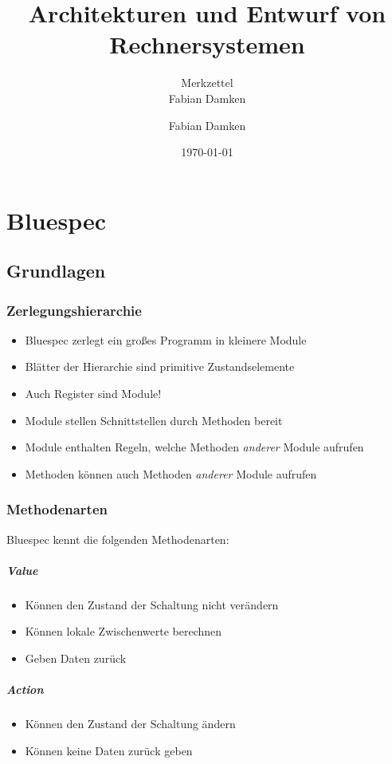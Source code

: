 \documentclass[a4paper, 11pt, accentcolor = tud3b]{tudreport}
\title{Architekturen und Entwurf von Rechnersystemen}
\subtitle{Merkzettel \\ Fabian Damken}
\author{Fabian Damken}
\date{\today}
\begin{document}
    \maketitle
    \tableofcontents
    \listoftodos

    \chapter{Bluespec}
		\section{Grundlagen}
			\subsection{Zerlegungshierarchie}
				\begin{itemize}
					\item Bluespec zerlegt ein großes Programm in kleinere Module
					\item Blätter der Hierarchie sind primitive Zustandselemente
					\item Auch Register sind Module!
					\item Module stellen Schnittstellen durch Methoden bereit
					\item Module enthalten Regeln, welche Methoden \textit{anderer} Module aufrufen
					\item Methoden können auch Methoden \textit{anderer} Module aufrufen
				\end{itemize}
			
			\subsection{Methodenarten}
				Bluespec kennt die folgenden Methodenarten:
				\paragraph{Value}
					\begin{itemize}
						\item Können den Zustand der Schaltung nicht verändern
						\item Können lokale Zwischenwerte berechnen
						\item Geben Daten zurück
					\end{itemize}
				
				\paragraph{Action}
					\begin{itemize}
						\item Können den Zustand der Schaltung ändern
						\item Können keine Daten zurück geben
					\end{itemize}
				
\end{document}
